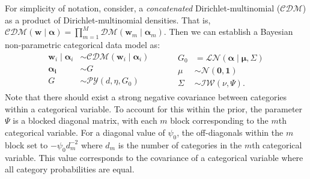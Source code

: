 For simplicity of notation, consider, a \emph{concatenated} 
    Dirichlet-multinomial ($\mathcal{CDM}$) as a product of 
    Dirichlet-multinomial densities.  That is, 
    $\mathcal{CDM}(\bm{w}\mid\bm{\alpha}) = 
        \prod_{m = 1}^M\mathcal{DM}(\bm{w}_m\mid\bm{\alpha}_m)$.
    Then we can establish a Bayesian non-parametric categorical data model as:
    \begin{equation}
      \label{eqn:modelcat}
      \begin{aligned}
      \bm{w}_i \mid \bm{\alpha}_i &\sim 
        \mathcal{CDM}\left(\bm{w}_i\mid\bm{\alpha}_i\right)\\
      \bm{\alpha_i} &\sim G\\
      G &\sim \mathcal{PY}\left(d, \eta, G_0\right)\\
      \end{aligned}
      ~\hspace{1cm}
      \begin{aligned}
      G_0 &= \mathcal{LN}\left(\bm{\alpha}\mid\bm{\mu},\Sigma\right)\\
      \mu &\sim \mathcal{N}\left(\bm{0},\bm{1}\right)\\
      \Sigma &\sim \mathcal{IW}\left(\nu, \Psi\right).
      \end{aligned}
    \end{equation}
    Note that there should exist a strong negative covariance between categories 
    within a categorical variable.  To account for this within the prior, the 
    parameter $\Psi$ is a blocked diagonal matrix, with each $m$ block 
    corresponding to the $m$th categorical variable.  For a diagonal value of 
    $\psi_0$, the off-diagonals within the $m$ block set to $-\psi_0 d_m^{-2}$ 
    where $d_m$ is the number of categories in the $m$th categorical variable.
    This value corresponds to the covariance of a categorical variable where all 
    category probabilities are equal.

